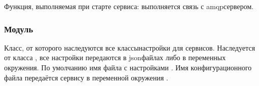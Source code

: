 \documentclass[a4paper,10pt,russian]{sphinxmanual}
\begin{document}
\begin{fulllineitems}
\begin{fulllineitems}
\end{fulllineitems}



\begin{fulllineitems}

\pysigstartsignatures
{}
\pysigstopsignatures
\sphinxAtStartPar
Функция, выполняемая при старте сервиса: выполняется связь с
amqp\sphinxhyphen{}сервером.

\end{fulllineitems}


\end{fulllineitems}



\subsubsection{Модуль }
\label{\detokenize{developer:base-svc-settings}}
\sphinxAtStartPar
Класс, от которого наследуются все классы\sphinxhyphen{}настройки для сервисов.
Наследуется от класса , все настройки передаются
в json\sphinxhyphen{}файлах либо в переменных окружения.
По умолчанию имя файла с настройками \sphinxhyphen{} .
Имя конфигурационного файла передаётся сервису в переменной окружения
.
\end{document}
